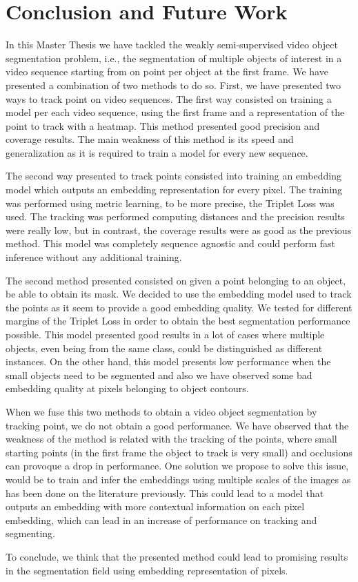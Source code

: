 
\chapter{Conclusion and Future Work}
\label{cha:conclusionsfuturework}

In this Master Thesis we have tackled the weakly semi-supervised video object segmentation problem, i.e., 
the segmentation of multiple objects of interest in a video sequence starting from on point per object at the first frame.
We have presented a combination of two methods to do so.
First, we have presented two ways to track point on video sequences.
The first way consisted on training a model per each video sequence, 
using the first frame and a representation of the point to track with a heatmap.
This method presented good precision and coverage results. 
The main weakness of this method is its speed and generalization as it is required to train a model for every new sequence.

The second way presented to track points consisted into training an embedding model which outputs an embedding representation for every pixel.
The training was performed using metric learning, to be more precise, the Triplet Loss was used.
The tracking was performed computing distances and the precision results were really low, but in contrast, 
the coverage results were as good as the previous method.
This model was completely sequence agnostic and could perform fast inference without any additional training.

The second method presented consisted on given a point belonging to an object, be able to obtain its mask.
We decided to use the embedding model used to track the points as it seem to provide a good embedding quality.
We tested for different margins of the Triplet Loss in order to obtain the best segmentation performance possible.
This model presented good results in a lot of cases where multiple objects, even being from the same class, 
could be distinguished as different instances.
On the other hand, 
this model presents low performance when the small objects need to be segmented and also we have observed some bad embedding quality at pixels belonging to object contours.

When we fuse this two methods to obtain a video object segmentation by tracking point, we do not obtain a good performance.
We have observed that the weakness of the method is related with the tracking of the points, where small starting points 
(in the first frame the object to track is very small)
and occlusions can provoque a drop in performance.
One solution we propose to solve this issue, would be to train and infer the embeddings using multiple scales of the images as has been done on the literature previously.
This could lead to a model that outputs an embedding with more contextual information on each pixel embedding, which can lead in an increase of performance on tracking and segmenting.

To conclude, we think that the presented method could lead to promising results in the segmentation field using embedding representation of pixels. 
